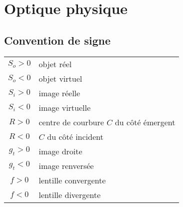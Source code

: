 \section{Optique physique}
\vspace{-2\baselineskip}
\subsection{Convention de signe}
\begin{tabular}{cl}
    $S_o > 0$ & objet réel \\
    $S_o < 0$ & objet virtuel\\\hline
    $S_i > 0$ & image réelle\\
    $S_i < 0$ & image virtuelle\\\hline
    $R > 0$ & centre de courbure $C$ du côté émergent\\
    $R < 0$ & $C$ du côté incident\\\hline
    $g_t > 0$ & image droite\\
    $g_t < 0$ & image renversée\\\hline
    $f>0$ & lentille convergente\\
    $f<0$ & lentille divergente
\end{tabular}
